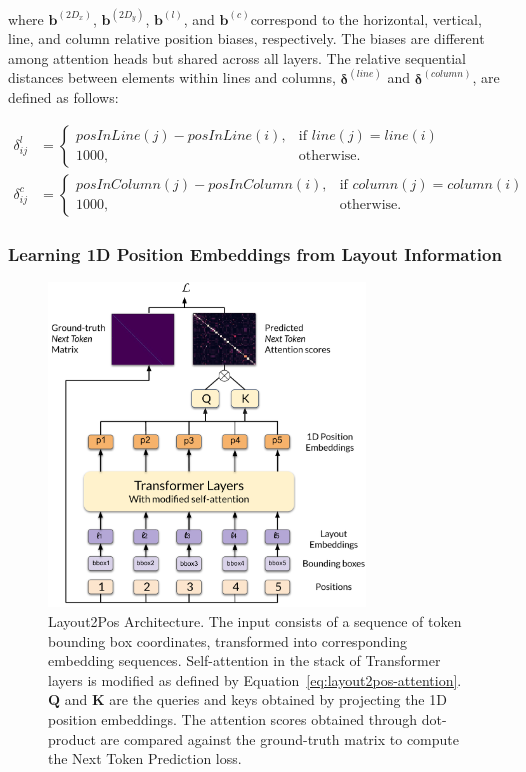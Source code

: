 \noindent where $\bm{b}^{(2D_x)}$, $\bm{b}^{(2D_y)}$, $\bm{b}^{(l)}$, and $\bm{b}^{(c)}$correspond to the horizontal, vertical, line, and column relative position biases, respectively. The biases are different among attention heads but shared across all layers. The relative sequential distances between elements within lines and columns, $\bm{\delta}^{(line)}$ and $\bm{\delta}^{(column)}$, are defined as follows:

\begin{equation}
  \begin{split}
    \delta^{l}_{ij} &= 
        \begin{cases}
          posInLine(j) - posInLine(i), & \text{if } line(j) = line(i)\\
            1000,              & \text{otherwise}.
        \end{cases} \\
    \delta^{c}_{ij} &= 
      \begin{cases}
        posInColumn(j) - posInColumn(i), & \text{if } column(j) = column(i)\\
          1000,              & \text{otherwise}.
      \end{cases}
  \end{split}
\end{equation}

\subsubsection{Learning 1D Position Embeddings from Layout Information}

\begin{figure}
  \centering
  \includegraphics[width=0.75\textwidth]{images/chapter4/Layout2Pos.pdf}
  \caption{Layout2Pos Architecture. The input consists of a sequence of token bounding box coordinates, transformed into corresponding embedding sequences. Self-attention in the stack of Transformer layers is modified as defined by Equation~\ref{eq:layout2pos-attention}. $\bm{Q}$ and $\bm{K}$ are the queries and keys obtained by projecting the 1D position embeddings. The attention scores obtained through dot-product are compared against the ground-truth matrix to compute the Next Token Prediction loss.}
  \label{fig:layout2pos-module}
\end{figure}


